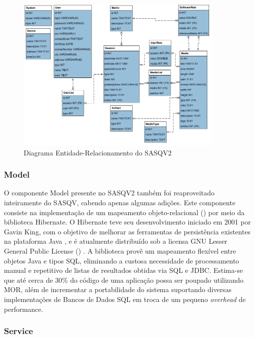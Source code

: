 \begin{figure}[!htb]
	\centering
	\includegraphics[width=0.9\textwidth]{./imgs/diagramaER.png}
	\caption{Diagrama Entidade-Relacionamento do SASQV2}
	\label{fig:diagramaER}
\end{figure}

\subsubsection{Model}

O componente Model presente no SASQV2 também foi reaproveitado inteiramente do SASQV, cabendo apenas algumas adições. Este componente consiste na implementação de um mapeamento objeto-relacional () por meio da biblioteca Hibernate. 
O Hibernate teve seu desenvolvimento iniciado em 2001 por Gavin King, com o objetivo de melhorar as ferramentas de persistência existentes na plataforma Java \cite{hibernateHistory}, e é atualmente distribuído sob a licensa GNU Lesser General Public License () \cite{hibernateAbout}.
A biblioteca provê um mapeamento flexível entre objetos Java e tipos SQL, eliminando a custosa necessidade de processamento manual e repetitivo de listas de resultados obtidas via SQL e JDBC.
Estima-se que até cerca de 30\% do código de uma aplicação possa ser poupado utilizando MOR, além de incrementar a portabilidade do sistema suportando diversas implementações de Bancos de Dados SQL em troca de um pequeno \emph{overhead} de performance.

\subsubsection{Service}

